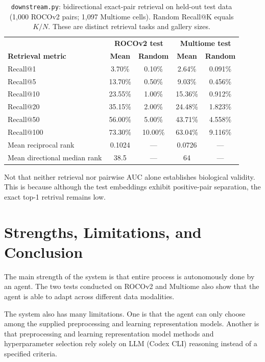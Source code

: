\documentclass[10pt]{article}
\begin{document}
\begin{table}[H]
\centering\small\setlength{\tabcolsep}{5pt}
\begin{tabular}{lcccc}
\toprule
 & \multicolumn{2}{c}{\textbf{ROCOv2 test}} & \multicolumn{2}{c}{\textbf{Multiome test}}\\
\textbf{Retrieval metric} & \textbf{Mean} & \textbf{Random} & \textbf{Mean} & \textbf{Random}\\\midrule
Recall@1 & 3.70\% & 0.10\% & 2.64\% & 0.091\%\\
Recall@5 & 13.70\% & 0.50\% & 9.03\% & 0.456\%\\
Recall@10 & 23.55\% & 1.00\% & 15.36\% & 0.912\%\\
Recall@20 & 35.15\% & 2.00\% & 24.48\% & 1.823\%\\
Recall@50 & 56.00\% & 5.00\% & 43.71\% & 4.558\%\\
Recall@100 & 73.30\% & 10.00\% & 63.04\% & 9.116\%\\
Mean reciprocal rank & 0.1024 & --- & 0.0726 & ---\\
Mean directional median rank & 38.5 & --- & 64 & ---\\
\bottomrule
\end{tabular}
\caption{\texttt{downstream.py}: bidirectional exact-pair retrieval on held-out test data (1,000 ROCOv2 pairs; 1,097 Multiome cells). Random Recall@K equals $K/N$. These are distinct retrieval tasks and gallery sizes.}
\label{tab:retrieval}
\end{table}

Not that neither retrieval nor pairwise AUC alone establishes biological validity. This is because although the test embeddings exhibit positive-pair separation,
the exact top-1 retrival remains low. 



\section{Strengths, Limitations, and Conclusion}

The main strength of the system is that entire process is autonomously done by an agent. 
The two tests conducted on ROCOv2 and Multiome also show that the agent is able to adapt across 
different data modalities. 

The system also has many limitations. One is that the agent can only choose among the supplied preprocessing 
and learning representation models. Another is that preprocessing and learning representation model methods and hyperparameter selection rely solely on LLM (Codex CLI) reasoning instead of a specified criteria. 
\end{document}
